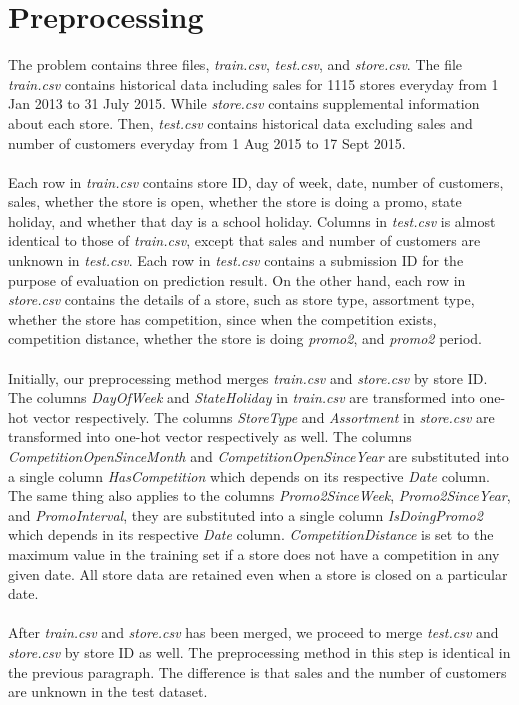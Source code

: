 \chapter{Preprocessing}
The problem contains three files, \textit{train.csv}, \textit{test.csv}, and \textit{store.csv}. The file \textit{train.csv} contains historical data including sales for 1115 stores everyday from 1 Jan 2013 to 31 July 2015. While \textit{store.csv} contains supplemental information about each store. Then, \textit{test.csv} contains historical data excluding sales and number of customers everyday from 1 Aug 2015 to 17 Sept 2015. \\ \\
Each row in \textit{train.csv} contains store ID, day of week, date, number of customers, sales, whether the store is open, whether the store is doing a promo, state holiday, and whether that day is a school holiday. Columns in \textit{test.csv} is almost identical to those of \textit{train.csv}, except that sales and number of customers are unknown in \textit{test.csv}. Each row in \textit{test.csv} contains a submission ID for the purpose of evaluation on prediction result. On the other hand, each row in \textit{store.csv} contains the details of a store, such as store type, assortment type, whether the store has competition, since when the competition exists, competition distance, whether the store is doing \textit{promo2}, and \textit{promo2} period. \\ \\
Initially, our preprocessing method merges \textit{train.csv} and \textit{store.csv} by store ID. The columns \textit{DayOfWeek} and \textit{StateHoliday} in \textit{train.csv}  are transformed into one-hot vector respectively. The columns \textit{StoreType} and \textit{Assortment} in \textit{store.csv} are transformed into one-hot vector respectively as well. The columns \textit{CompetitionOpenSinceMonth} and \textit{CompetitionOpenSinceYear} are substituted into a single column \textit{HasCompetition} which depends on its respective \textit{Date} column. The same thing also applies to the columns \textit{Promo2SinceWeek}, \textit{Promo2SinceYear}, and \textit{PromoInterval}, they are substituted into a single column \textit{IsDoingPromo2} which depends in its respective \textit{Date} column. \textit{CompetitionDistance} is set to the maximum value in the training set if a store does not have a competition in any given date. All store data are retained even when a store is closed on a particular date. \\ \\
After \textit{train.csv} and \textit{store.csv} has been merged, we proceed to merge \textit{test.csv} and \textit{store.csv} by store ID as well. The preprocessing method in this step is identical in the previous paragraph. The difference is that sales and the number of customers are unknown in the test dataset.